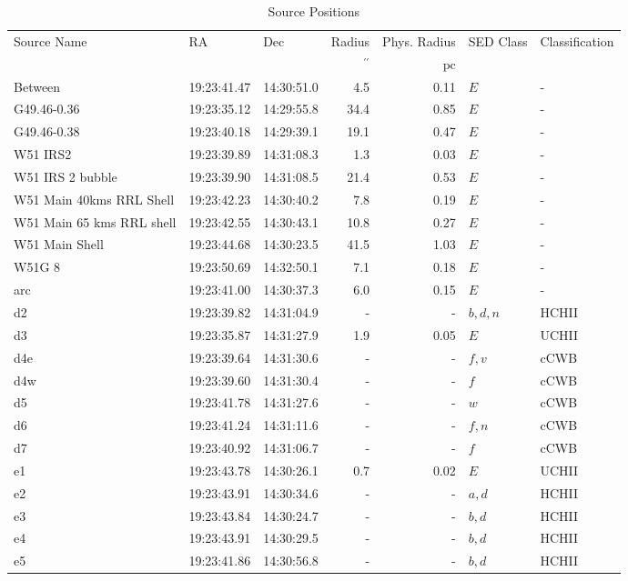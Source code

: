 \begin{table*}[htp]
\caption{Source Positions}
\begin{tabular}{lllrrll}
\label{tab:positions}
Source Name & RA & Dec & Radius & Phys. Radius & SED Class & Classification \\
 &  &  & $\mathrm{{}^{\prime\prime}}$ & $\mathrm{pc}$ &  &  \\
\hline
Between & 19:23:41.47 & 14:30:51.0 & 4.5 & 0.11 & $E$ & - \\
G49.46-0.36 & 19:23:35.12 & 14:29:55.8 & 34.4 & 0.85 & $E$ & - \\
G49.46-0.38 & 19:23:40.18 & 14:29:39.1 & 19.1 & 0.47 & $E$ & - \\
W51 IRS2 & 19:23:39.89 & 14:31:08.3 & 1.3 & 0.03 & $E$ & - \\
W51 IRS 2 bubble & 19:23:39.90 & 14:31:08.5 & 21.4 & 0.53 & $E$ & - \\
W51 Main 40kms RRL Shell & 19:23:42.23 & 14:30:40.2 & 7.8 & 0.19 & $E$ & - \\
W51 Main 65 kms RRL shell & 19:23:42.55 & 14:30:43.1 & 10.8 & 0.27 & $E$ & - \\
W51 Main Shell & 19:23:44.68 & 14:30:23.5 & 41.5 & 1.03 & $E$ & - \\
W51G 8 & 19:23:50.69 & 14:32:50.1 & 7.1 & 0.18 & $E$ & - \\
arc & 19:23:41.00 & 14:30:37.3 & 6.0 & 0.15 & $E$ & - \\
d2 & 19:23:39.82 & 14:31:04.9 & - & - & $b,d,n$ & HCHII \\
d3 & 19:23:35.87 & 14:31:27.9 & 1.9 & 0.05 & $E$ & UCHII \\
d4e & 19:23:39.64 & 14:31:30.6 & - & - & $f,v$ & cCWB \\
d4w & 19:23:39.60 & 14:31:30.4 & - & - & $f$ & cCWB \\
d5 & 19:23:41.78 & 14:31:27.6 & - & - & $w$ & cCWB \\
d6 & 19:23:41.24 & 14:31:11.6 & - & - & $f,n$ & cCWB \\
d7 & 19:23:40.92 & 14:31:06.7 & - & - & $f$ & cCWB \\
e1 & 19:23:43.78 & 14:30:26.1 & 0.7 & 0.02 & $E$ & UCHII \\
e2 & 19:23:43.91 & 14:30:34.6 & - & - & $a,d$ & HCHII \\
e3 & 19:23:43.84 & 14:30:24.7 & - & - & $b,d$ & HCHII \\
e4 & 19:23:43.91 & 14:30:29.5 & - & - & $b,d$ & HCHII \\
e5 & 19:23:41.86 & 14:30:56.8 & - & - & $b,d$ & HCHII \\

\end{tabular}
\end{table*}
